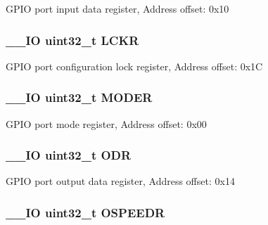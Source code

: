 G\-P\-I\-O port input data register, Address offset\-: 0x10 \hypertarget{struct_g_p_i_o___type_def_a2612a0f4b3fbdbb6293f6dc70105e190}{
\subsubsection[{L\-C\-K\-R}]{\setlength{\rightskip}{0pt plus 5cm}\-\_\-\-\_\-\-I\-O uint32\-\_\-t L\-C\-K\-R}}\label{struct_g_p_i_o___type_def_a2612a0f4b3fbdbb6293f6dc70105e190}
G\-P\-I\-O port configuration lock register, Address offset\-: 0x1\-C \hypertarget{struct_g_p_i_o___type_def_a2b671a94c63a612f81e0e9de8152d01c}{
\subsubsection[{M\-O\-D\-E\-R}]{\setlength{\rightskip}{0pt plus 5cm}\-\_\-\-\_\-\-I\-O uint32\-\_\-t M\-O\-D\-E\-R}}\label{struct_g_p_i_o___type_def_a2b671a94c63a612f81e0e9de8152d01c}
G\-P\-I\-O port mode register, Address offset\-: 0x00 \hypertarget{struct_g_p_i_o___type_def_abff7fffd2b5a718715a130006590c75c}{
\subsubsection[{O\-D\-R}]{\setlength{\rightskip}{0pt plus 5cm}\-\_\-\-\_\-\-I\-O uint32\-\_\-t O\-D\-R}}\label{struct_g_p_i_o___type_def_abff7fffd2b5a718715a130006590c75c}
G\-P\-I\-O port output data register, Address offset\-: 0x14 \hypertarget{struct_g_p_i_o___type_def_a328d16cc6213783ede54e4059ffd50a3}{
\subsubsection[{O\-S\-P\-E\-E\-D\-R}]{\setlength{\rightskip}{0pt plus 5cm}\-\_\-\-\_\-\-I\-O uint32\-\_\-t O\-S\-P\-E\-E\-D\-R}}\label{struct_g_p_i_o___type_def_a328d16cc6213783ede54e4059ffd50a3}
